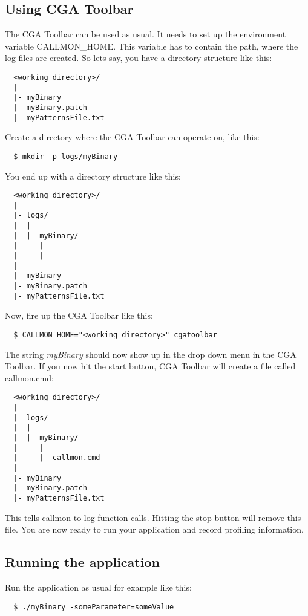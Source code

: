\subsection{Using CGA Toolbar} The CGA Toolbar can be used as usual. It needs to set up the environment variable CALLMON\_HOME. This variable has to contain the path, where the log files are created. So lets say, you have a directory structure like this:

\begin{verbatim}
  <working directory>/
  |
  |- myBinary
  |- myBinary.patch
  |- myPatternsFile.txt
\end{verbatim}

Create a directory where the CGA Toolbar can operate on, like this:
\begin{verbatim}
  $ mkdir -p logs/myBinary
\end{verbatim}

You end up with a directory structure like this:
\begin{verbatim}
  <working directory>/
  |
  |- logs/
  |  |
  |  |- myBinary/
  |     |
  |     |
  |
  |- myBinary
  |- myBinary.patch
  |- myPatternsFile.txt
\end{verbatim}

Now, fire up the CGA Toolbar like this:
\begin{verbatim}
  $ CALLMON_HOME="<working directory>" cgatoolbar
\end{verbatim}

The string \emph{myBinary} should now show up in the drop down menu in the CGA Toolbar. If you now hit the start button, CGA Toolbar will create a file called callmon.cmd:
\begin{verbatim}
  <working directory>/
  |
  |- logs/
  |  |
  |  |- myBinary/
  |     |
  |     |- callmon.cmd
  |
  |- myBinary
  |- myBinary.patch
  |- myPatternsFile.txt
\end{verbatim}

This tells callmon to log function calls. Hitting the stop button will remove this file. You are now ready to run your application and record profiling information.

\subsection{Running the application} Run the application as usual for example like this:
\begin{verbatim}
  $ ./myBinary -someParameter=someValue
\end{verbatim}


